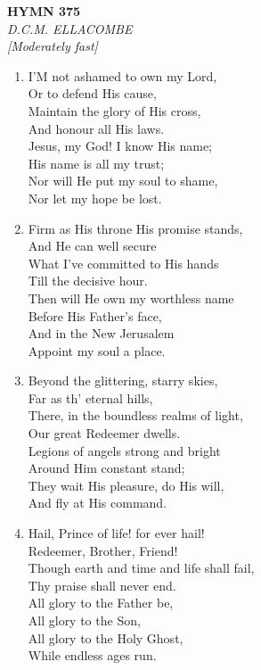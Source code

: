 \documentclass[11pt,a4paper]{article}
\begin{document}
\newpage
\begin{center}
    {\Large \textbf{HYMN 375}}
    \\
    \textit{D.C.M. ELLACOMBE}
    \\
    \textit{\small [Moderately fast]}
\end{center}
\vspace{1em}

\begin{enumerate}
    \item I'M not ashamed to own my Lord, \\
        Or to defend His cause, \\
        Maintain the glory of His cross, \\
        And honour all His laws. \\
        Jesus, my God! I know His name; \\
        His name is all my trust; \\
        Nor will He put my soul to shame, \\
        Nor let my hope be lost.

    \item Firm as His throne His promise stands, \\
        And He can well secure \\
        What I've committed to His hands \\
        Till the decisive hour. \\
        Then will He own my worthless name \\
        Before His Father's face, \\
        And in the New Jerusalem \\
        Appoint my soul a place.

    \item Beyond the glittering, starry skies, \\
        Far as th' eternal hills, \\
        There, in the boundless realms of light, \\
        Our great Redeemer dwells. \\
        Legions of angels strong and bright \\
        Around Him constant stand; \\
        They wait His pleasure, do His will, \\
        And fly at His command.

    \item Hail, Prince of life! for ever hail! \\
        Redeemer, Brother, Friend! \\
        Though earth and time and life shall fail, \\
        Thy praise shall never end. \\
        All glory to the Father be, \\
        All glory to the Son, \\
        All glory to the Holy Ghost, \\
        While endless ages run.

\end{enumerate}
\end{document}
